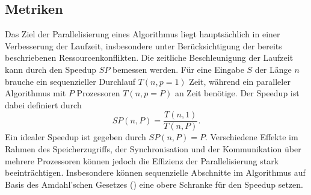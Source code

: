 \subsection{Metriken}
Das Ziel der Parallelisierung eines Algorithmus liegt hauptsächlich in einer Verbesserung der Laufzeit, insbesondere unter Berücksichtigung der bereits beschriebenen Ressourcenkonflikten. 
Die zeitliche Beschleunigung der Laufzeit kann durch den Speedup $SP$ bemessen werden. Für eine Eingabe $S$ der Länge $n$ brauche ein sequenzieller Durchlauf $T(n, p=1)$ Zeit, während ein 
paralleler Algorithmus mit $P$ Prozessoren $T(n,p=P)$ an Zeit benötige. Der Speedup ist dabei definiert durch
\begin{equation}
    SP(n,P) = \frac{T(n,1)}{T(n,P)}.
\end{equation}
Ein idealer Speedup ist gegeben durch $SP(n,P)=P$. Verschiedene Effekte im Rahmen des Speicherzugriffs, der Synchronisation und der Kommunikation über mehrere Prozessoren können jedoch
die Effizienz der Parallelisierung stark beeinträchtigen. Insbesondere können sequenzielle Abschnitte im Algorithmus auf Basis des Amdahl'schen Gesetzes (\cite{mccool}) eine obere Schranke 
für den Speedup setzen. 